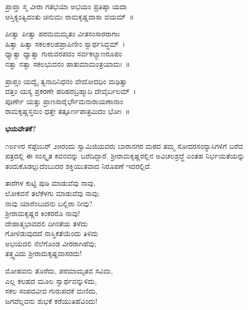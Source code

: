 \begin{myquote}
ಪ್ರಾಪ್ತಾ ಸ್ಮ ವೀರಾ ಗತಭಯಾ ಅಭಯಂ ಪ್ರತಿಷ್ಠಾ ಯದಾ\\ಆಸ್ತಿಕ್ಯಂತ್ವಿದಂತು ಚಿನುಮಃ ರಾಮಕೃಷ್ಣದಾಸಾ ವಯಮ್~॥
\end{myquote}

\begin{myquote}
ಪೀತ್ವಾ ಪೀತ್ವಾ ಪರಮಮಮೃತಂ ವೀತಸಂಸಾರರಾಗಾಃ\\ಹಿತ್ವಾ ಹಿತ್ವಾ ಸಕಲಕಲಹಪ್ರಾಪಿಣೀಂ ಸ್ವಾರ್ಥಸಿದ್ಧಮ್~।\\ಧ್ಯಾತ್ವಾ ಧ್ಯಾತ್ವಾ ಗುರುವರಪದಂ ಸರ್ವಕಲ್ಯಾಣರೂಪಂ\\ನತ್ವಾ ನತ್ವಾ ಸಕಲಭುವನಂ ಪಾತುಮಾಮಂತ್ರಯಾಮಃ~॥
\end{myquote}

\begin{myquote}
ಪ್ರಾಪ್ತಂ ಯದ್ವೈ ತ್ವನಾದಿನಿಧನಂ ವೇದೋದಧಿಂ ಮಢಿತ್ವಾ\\ದತ್ತಂ ಯಸ್ಯ ಪ್ರಕರಣೇ ಹರಿಹರಬ್ರಹ್ಮಾದಿ ದೇವೈರ್ಬಲಮ್~।\\
ಪೂರ್ಣೇ ಯತ್ತು ಪ್ರಾಣಸಾರೈರ್ಭೌಮನಾರಾಯಣಾನಾಂ\\ರಾಮಕೃಷ್ಣಸ್ತನುಂ ಧತ್ತೇ ತತ್ಪೂರ್ಣಪಾತ್ರಮಿದಂ ಭೋಃ~॥
\end{myquote}

\begin{center}
\textbf{ಭಯವೇತಕೆ?}
\end{center}

೧೮೯೪ರ ಸೆಪ್ಟೆಂಬರ್ ೨೫ರಂದು ಸ್ವಾಮಿಜಿಯವರು ಬಾರಾನಗರ ಮಠದ ತಮ್ಮ ಸೋದರಸಂನ್ಯಾಸಿಗಳಿಗೆ ಬರೆದ ಪತ್ರದಲ್ಲಿ ಈ ಸಂಸ್ಕೃತ ಕವನವನ್ನು ಬರೆದಿದ್ದಾರೆ. ಶ‍್ರೀರಾಮಕೃಷ್ಣರಲ್ಲಿನ ಅವಿಚಲಶ್ರದ್ಧೆ ಎಂತಹ ನಿರ್ಭಯತೆಯನ್ನು ತಂದುಕೊಡಲ್ಲುದೆಂಬುದರ ಶಕ್ತಿಯುತವಾದ ನಿರೂಪಣೆ ಇದರಲ್ಲಿದೆ.

\begin{myquote}
ತಾರೆಗಳ ಕುಟ್ಟಿ ಪುಡಿ ಮಾಡುವೆವು ನಾವು,\\ಲೋಕವನೆ ತಲೆಕೆಳಗು ಮಾಡುವೆವು ನಾವು;\\ನಾವು ಯಾರೆಂಬುದನು ಬಲ್ಲಿರಾ ನೀವು?\\ಶ‍್ರೀರಾಮಕೃಷ್ಣರ ಕಿಂಕರರೊ ನಾವು!\\ದೇಹಾತ್ಮಭಾವದಲಿ ದೀನತೆಯ ತಳೆದು\\ಗೋಳಿಡುವುದದೆ ನಾಸ್ತಿಕತೆಯೆಂದು ತಿಳಿದು\\ಅಭಯದಲಿ ನೆಲೆಗೊಂಡ ವೀರರಾಗಿಹೆವು;\\ತತ್ತ್ವವಿದು ಶ‍್ರೀರಾಮಕೃಷ್ಣದಾಸರದು!
\end{myquote}

\begin{myquote}
ಮೋಹವನು ತೊರೆದು, ಪರಮಾಮೃತವ ಸವಿದು,\\ಎಲ್ಲ ಕಲಹದ ಮೂಲ ಸ್ವಾರ್ಥವನ್ನುಳಿದು,\\ಸಕಲ ಸಂಪದವೀವ ಗುರುಪದಕೆ ಮಣಿದು,\\ಜಗವೆಲ್ಲವನು ಶುಭಕೆ ಕರೆಯುತಿಹೆವಿಂದು!
\end{myquote}

